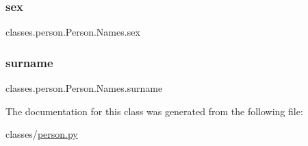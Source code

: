 \subsubsection{\texorpdfstring{sex}{sex}}
{\footnotesize\ttfamily classes.\+person.\+Person.\+Names.\+sex}

\mbox{\label{classclasses_1_1person_1_1Person_1_1Names_a8942bf5d3f1d5442338cf188052d003b}} 
\subsubsection{\texorpdfstring{surname}{surname}}
{\footnotesize\ttfamily classes.\+person.\+Person.\+Names.\+surname}



The documentation for this class was generated from the following file\+:\begin{DoxyCompactItemize}
\item 
classes/\hyperlink{person_8py}{person.\+py}\end{DoxyCompactItemize}
